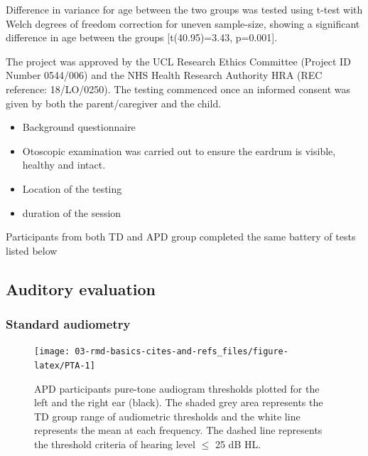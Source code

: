 \documentclass[a4paper,nobind]{templates/ociamthesis}
\providecommand{\tightlist}{%
  \setlength{\itemsep}{0pt}\setlength{\parskip}{0pt}}
\begin{document}
Difference in variance for age between the two groups was tested using t-test with Welch degrees of freedom correction for uneven sample-size, showing a significant difference in age between the groups {[}t(40.95)=3.43, p=0.001{]}.

The project was approved by the UCL Research Ethics Committee (Project ID Number 0544/006) and the NHS Health Research Authority HRA (REC reference: 18/LO/0250). The testing commenced once an informed consent was given by both the parent/caregiver and the child.

\begin{itemize}
\tightlist
\item
  Background questionnaire
\item
  Otoscopic examination was carried out to ensure the eardrum is visible, healthy and intact.
\item
  Location of the testing
\item
  duration of the session
\end{itemize}

Participants from both TD and APD group completed the same battery of tests listed below

\hypertarget{auditory-evaluation}{%
\subsection{Auditory evaluation}\label{auditory-evaluation}}

\hypertarget{standard-audiometry}{%
\subsubsection{\texorpdfstring{\textbf{Standard audiometry}}{Standard audiometry}}\label{standard-audiometry}}

\begin{figure}

{\centering \texttt{[image: 03-rmd-basics-cites-and-refs\_files/figure-latex/PTA-1]} 

}

\caption{APD participants pure-tone audiogram thresholds plotted for the left and the right ear (black). The shaded grey area represents the TD group range of audiometric thresholds and the white line represents the mean at each frequency. The dashed line represents the threshold criteria of hearing level $\leq$ 25 dB HL.}\label{fig:PTA}
\end{figure}
\end{document}
